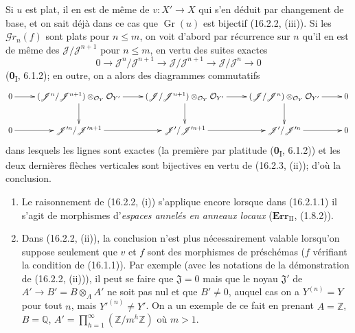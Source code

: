 Si $u$ est plat, il en est de même de $v:X'\to X$ qui s'en déduit par
changement de base, et on sait déjà dans ce cas que $\operatorname{Gr}(u)$ est
bijectif (16.2.2, (iii)). Si les $\mathscr{G}r_n(f)$ sont plats pour
$n\leq m$, on voit d'abord par récurrence sur $n$ qu'il en est de même des
$\mathscr{J}/\mathscr{J}^{n+1}$ pour $n\leq m$, en vertu des suites exactes
\[
  0\longrightarrow\mathscr{J}^n/\mathscr{J}^{n+1}
  \longrightarrow\mathscr{J}/\mathscr{J}^{n+1}
  \longrightarrow\mathscr{J}/\mathscr{J}^n
  \longrightarrow 0
\]
(\textbf{0}\textsubscript{I}, 6.1.2); en outre, on a alors des diagrammes commutatifs
\[
  \xymatrix{
    0 \ar[r] &
    (\mathscr{J}^n/\mathscr{J}^{n+1})
      \otimes_{\mathcal{O}_Y}\mathcal{O}_{Y'}
      \ar[r]\ar[d] &
    (\mathscr{J}/\mathscr{J}^{n+1})
      \otimes_{\mathcal{O}_Y}\mathcal{O}_{Y'}
      \ar[r]\ar[d] &
    (\mathscr{J}/\mathscr{J}^n)
      \otimes_{\mathcal{O}_Y}\mathcal{O}_{Y'}
      \ar[r]\ar[d] & 0 \\
    0 \ar[r] &
    \mathscr{J}'^n/\mathscr{J}'^{n+1}
      \ar[r] &
    \mathscr{J}'/\mathscr{J}'^{n+1}
      \ar[r] &
    \mathscr{J}'/\mathscr{J}'^n
      \ar[r] & 0
  }
\]
dans lesquels les lignes sont exactes (la première par platitude
(\textbf{0}\textsubscript{I}, 6.1.2)) et les deux dernières flèches verticales sont
bijectives en vertu de (16.2.3, (ii)); d'où la conclusion.

\begin{remarks}[16.2.5]
\label{IV.16.2.5}
\begin{enumerate}
\item[(i)] Le raisonnement de (16.2.2, (i)) s'applique encore lorsque dans
(16.2.1.1) il s'agit de morphismes d'\emph{espaces annelés en anneaux locaux}
($\mathbf{Err}_{\mathrm{II}}$, (1.8.2)).
\item[(ii)] Dans (16.2.2, (ii)), la conclusion n'est plus nécessairement valable
lorsqu'on suppose seulement que $v$ et $f$ sont des morphismes de préschémas
($f$ vérifiant la condition de (16.1.1)). Par exemple (avec les notations de la
démonstration de (16.2.2, (ii))), il peut se faire que $\mathfrak{J}=0$ mais que
le noyau $\mathfrak{J}'$ de $A'\to B'=B\otimes_A A'$ ne soit pas nul et que
$B'\neq 0$, auquel cas on a $Y^{(n)}=Y$ pour tout $n$, mais
$Y'^{(n)}\neq Y'$. On a un exemple de ce fait en prenant
$A=\mathbb{Z}$, $B=\mathbb{Q}$,
$A'=\prod_{h=1}^{\infty}(\mathbb{Z}/m^h\mathbb{Z})$ où $m>1$.
\end{enumerate}
\end{remarks}

